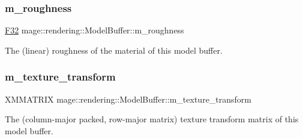 \subsubsection{\texorpdfstring{m\+\_\+roughness}{m\_roughness}}
{\footnotesize\ttfamily \mbox{\hyperlink{namespacemage_aa97e833b45f06d60a0a9c4fc22ae02c0}{F32}} mage\+::rendering\+::\+Model\+Buffer\+::m\+\_\+roughness}

The (linear) roughness of the material of this model buffer. \mbox{\label{structmage_1_1rendering_1_1_model_buffer_a89ae6a1222a84b0f166f5e46b35411b6}} 
\subsubsection{\texorpdfstring{m\+\_\+texture\+\_\+transform}{m\_texture\_transform}}
{\footnotesize\ttfamily X\+M\+M\+A\+T\+R\+IX mage\+::rendering\+::\+Model\+Buffer\+::m\+\_\+texture\+\_\+transform}

The (column-\/major packed, row-\/major matrix) texture transform matrix of this model buffer. 
